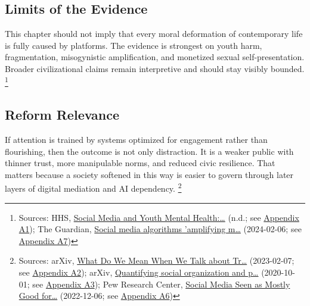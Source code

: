\documentclass[
  american,
  11pt,
  letterpaper,
]{article}
\begin{document}
\subsection{Limits of the Evidence}\label{limits-of-the-evidence}

This chapter should not imply that every moral deformation of
contemporary life is fully caused by platforms. The evidence is
strongest on youth harm, fragmentation, misogynistic amplification, and
monetized sexual self-presentation. Broader civilizational claims remain
interpretive and should stay visibly bounded. \footnote{Sources: HHS,
  \href{https://www.hhs.gov/surgeongeneral/priorities/youth-mental-health/social-media/index.html}{Social
  Media and Youth Mental Health:\ldots{}} (n.d.; see
  \hyperref[appendix-a1-social-media-and-youth-mental-health-the-u-s-surgeon-general-s-advisory]{Appendix
  A1}); The Guardian,
  \href{https://www.theguardian.com/media/2024/feb/06/social-media-algorithms-amplifying-misogynistic-content}{Social
  media algorithms 'amplifying m\ldots{}} (2024-02-06; see
  \hyperref[appendix-a7-social-media-algorithms-amplifying-misogynistic-content]{Appendix
  A7})}

\subsection{Reform Relevance}\label{reform-relevance}

If attention is trained by systems optimized for engagement rather than
flourishing, then the outcome is not only distraction. It is a weaker
public with thinner trust, more manipulable norms, and reduced civic
resilience. That matters because a society softened in this way is
easier to govern through later layers of digital mediation and AI
dependency. \footnote{Sources: arXiv,
  \href{https://arxiv.org/abs/2302.03671}{What Do We Mean When We Talk
  about Tr\ldots{}} (2023-02-07; see
  \hyperref[appendix-a2-what-do-we-mean-when-we-talk-about-trust-in-social-media-a-systematic-review]{Appendix
  A2}); arXiv, \href{https://arxiv.org/abs/2010.00590}{Quantifying
  social organization and p\ldots{}} (2020-10-01; see
  \hyperref[appendix-a3-quantifying-social-organization-and-political-polarization-in-online-platforms]{Appendix
  A3}); Pew Research Center,
  \href{https://www.pewresearch.org/global/2022/12/06/social-media-seen-as-mostly-good-for-democracy-across-many-nations-but-u-s-is-a-major-outlier/}{Social
  Media Seen as Mostly Good for\ldots{}} (2022-12-06; see
  \hyperref[appendix-a6-social-media-seen-as-mostly-good-for-democracy-across-many-nations-but-u-s-is-a-major-outlier]{Appendix
  A6})}
\end{document}
